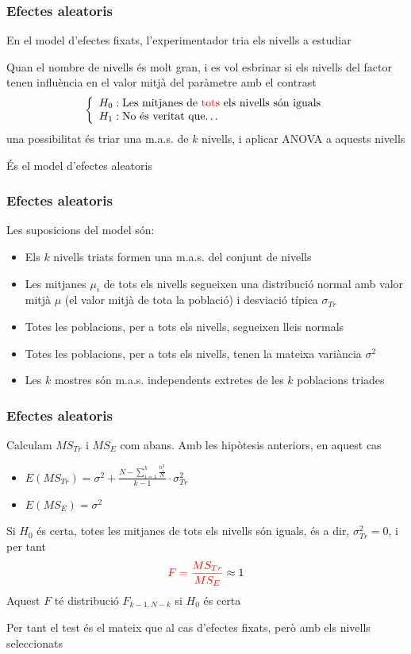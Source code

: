 \documentclass[12pt,t]{beamer}
\newcommand{\red}[1]{\textcolor{red}{#1}}
\renewcommand{\emph}[1]{{\color{red}#1}}
\theoremstyle{plain}
\theoremstyle{definition}
\begin{document}
\begin{frame}
\frametitle{Efectes aleatoris}

En el model d'efectes fixats, l'experimentador tria els nivells a estudiar
\medskip

Quan el nombre de nivells és molt gran, i es vol esbrinar si els nivells del factor tenen influència en el valor mitjà del paràmetre amb el contrast
$$
\left\{
\begin{array}{l}
H_0 : \mbox{Les mitjanes de \emph{tots} els nivells són iguals} \\
H_1 : \mbox{No és veritat que\ldots}
\end{array}
\right.
$$
una possibilitat és \emph{triar una m.a.s.} de $k$ nivells, i aplicar ANOVA a aquests nivells
\medskip

És el \emph{model d'efectes aleatoris}
\end{frame}

\begin{frame}
\frametitle{Efectes aleatoris}
Les suposicions del model són:

\begin{itemize}
\item Els $k$ nivells triats formen una m.a.s. del conjunt de nivells
\smallskip

\item Les mitjanes $\mu_i$ de tots els nivells segueixen una distribució normal amb valor mitjà $\mu$ (el valor mitjà de tota la població) i desviació típica $\sigma_{Tr}$
\smallskip


\item Totes les poblacions, per a tots els nivells, segueixen lleis normals
\smallskip


\item Totes les poblacions, per a tots els nivells, tenen la mateixa variància $\sigma^2$
\smallskip


\item Les $k$ mostres són m.a.s. independents
extretes de les $k$ poblacions triades
\end{itemize}
\end{frame}

\begin{frame}
\frametitle{Efectes aleatoris}

Calculam $MS_{Tr}$ i $MS_E$ com abans. Amb les hipòtesis anteriors, en aquest cas
\begin{itemize}
\item $E(MS_{Tr})=\displaystyle\sigma^2 + \frac{N-\sum_{i=1}^k \frac{n_i^2}{N}}{k-1}\cdot \sigma_{Tr}^2$
\medskip

\item $E(MS_E)=\sigma^2$
\end{itemize}
Si $H_0$ és certa, totes les mitjanes de tots els nivells són iguals, és a dir, $\sigma_{Tr}^2=0$, i per tant 
$$
\red{F=\frac{MS_{Tr}}{MS_E}}\approx 1
$$
Aquest $F$ té distribució $F_{k-1,N-k}$ si $H_0$ és certa
\medskip

Per tant \emph{el test és el mateix que al cas d'efectes fixats}, però amb els nivells seleccionats
\end{frame}
\end{document}
